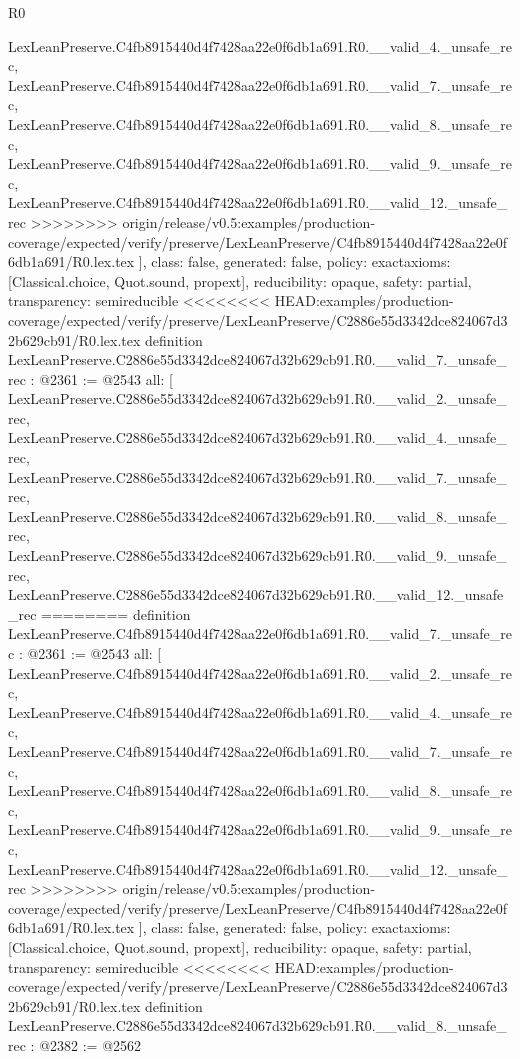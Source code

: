 \begin{lexlean}{R0}
\begin{coremodule}
{{{{{{{{{{{{{{{{{{{{{{{{{{{{{{{{{{{{{{{{{{{{{{{{{{{{    LexLeanPreserve.C4fb8915440d4f7428aa22e0f6db1a691.R0.__valid_4._unsafe_rec,
    LexLeanPreserve.C4fb8915440d4f7428aa22e0f6db1a691.R0.__valid_7._unsafe_rec,
    LexLeanPreserve.C4fb8915440d4f7428aa22e0f6db1a691.R0.__valid_8._unsafe_rec,
    LexLeanPreserve.C4fb8915440d4f7428aa22e0f6db1a691.R0.__valid_9._unsafe_rec,
    LexLeanPreserve.C4fb8915440d4f7428aa22e0f6db1a691.R0.__valid_12._unsafe_rec
>>>>>>>> origin/release/v0.5:examples/production-coverage/expected/verify/preserve/LexLeanPreserve/C4fb8915440d4f7428aa22e0f6db1a691/R0.lex.tex
  ],
  class: false,
  generated: false,
  policy: exact{axioms: [Classical.choice, Quot.sound, propext]},
  reducibility: opaque{},
  safety: partial,
  transparency: semireducible
}
<<<<<<<< HEAD:examples/production-coverage/expected/verify/preserve/LexLeanPreserve/C2886e55d3342dce824067d32b629cb91/R0.lex.tex
definition LexLeanPreserve.C2886e55d3342dce824067d32b629cb91.R0.__valid_7._unsafe_rec : @2361 := @2543 {
  all: [
    LexLeanPreserve.C2886e55d3342dce824067d32b629cb91.R0.__valid_2._unsafe_rec,
    LexLeanPreserve.C2886e55d3342dce824067d32b629cb91.R0.__valid_4._unsafe_rec,
    LexLeanPreserve.C2886e55d3342dce824067d32b629cb91.R0.__valid_7._unsafe_rec,
    LexLeanPreserve.C2886e55d3342dce824067d32b629cb91.R0.__valid_8._unsafe_rec,
    LexLeanPreserve.C2886e55d3342dce824067d32b629cb91.R0.__valid_9._unsafe_rec,
    LexLeanPreserve.C2886e55d3342dce824067d32b629cb91.R0.__valid_12._unsafe_rec
========
definition LexLeanPreserve.C4fb8915440d4f7428aa22e0f6db1a691.R0.__valid_7._unsafe_rec : @2361 := @2543 {
  all: [
    LexLeanPreserve.C4fb8915440d4f7428aa22e0f6db1a691.R0.__valid_2._unsafe_rec,
    LexLeanPreserve.C4fb8915440d4f7428aa22e0f6db1a691.R0.__valid_4._unsafe_rec,
    LexLeanPreserve.C4fb8915440d4f7428aa22e0f6db1a691.R0.__valid_7._unsafe_rec,
    LexLeanPreserve.C4fb8915440d4f7428aa22e0f6db1a691.R0.__valid_8._unsafe_rec,
    LexLeanPreserve.C4fb8915440d4f7428aa22e0f6db1a691.R0.__valid_9._unsafe_rec,
    LexLeanPreserve.C4fb8915440d4f7428aa22e0f6db1a691.R0.__valid_12._unsafe_rec
>>>>>>>> origin/release/v0.5:examples/production-coverage/expected/verify/preserve/LexLeanPreserve/C4fb8915440d4f7428aa22e0f6db1a691/R0.lex.tex
  ],
  class: false,
  generated: false,
  policy: exact{axioms: [Classical.choice, Quot.sound, propext]},
  reducibility: opaque{},
  safety: partial,
  transparency: semireducible
}
<<<<<<<< HEAD:examples/production-coverage/expected/verify/preserve/LexLeanPreserve/C2886e55d3342dce824067d32b629cb91/R0.lex.tex
definition LexLeanPreserve.C2886e55d3342dce824067d32b629cb91.R0.__valid_8._unsafe_rec : @2382 := @2562 {
}}}}}}}}}}}}}}}}}}}}}}}}}}}}}}}}}}}}}}}}}}}}}}}}}}}}}
\end{coremodule}
\end{lexlean}
